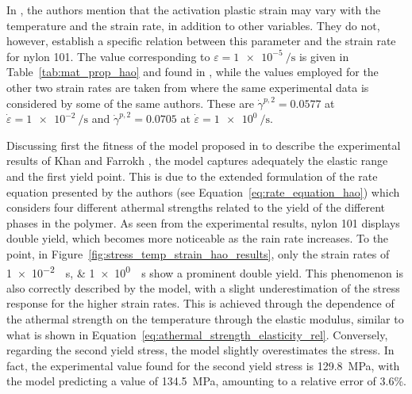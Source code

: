 In \cite{haoUnifiedAmorphousCrystalline2022}, the authors mention that the activation plastic strain may vary with the temperature and the strain rate, in addition to other variables.
They do not, however, establish a specific relation between this parameter and the strain rate for nylon 101.
The value corresponding to $\varepsilon=\SI{1e-5}{\per\second}$ is given in Table~\ref{tab:mat_prop_hao} and found in \cite{haoUnifiedAmorphousCrystalline2022}, while the values employed for the other two strain rates are taken from \cite{haoRatedependentConstitutiveModel2022} where the same experimental data is considered by some of the same authors.
These are $\dot\gamma^{p,2}=\num{0.0577}$ at $\dot\varepsilon = \SI{1e-2}{\per\second}$ and $\dot\gamma^{p,2}=\num{0.0705}$ at $\dot\varepsilon = \SI{1e0}{\per\second}$.

Discussing first the fitness of the model proposed in \cite{haoUnifiedAmorphousCrystalline2022} to describe the experimental results of Khan and Farrokh \citep{khanThermomechanicalResponseNylon2006}, the model captures adequately the elastic range and the first yield point.
This is due to the extended formulation of the rate equation presented by the authors (see Equation~\eqref{eq:rate_equation_hao}) which considers four different athermal strengths related to the yield of the different phases in the polymer.
As seen from the experimental results, nylon 101 displays double yield, which becomes more noticeable as the rain rate increases.
To the point, in Figure~\ref{fig:stress_temp_strain_hao_results}, only the strain rates of \SIlist{1e-2;1e0}{\per\second} show a prominent double yield.
This phenomenon is also correctly described by the model, with a slight underestimation of the stress response for the higher strain rates.
This is achieved through the dependence of the athermal strength on the temperature through the elastic modulus, similar to what is shown in Equation~\eqref{eq:athermal_strength_elasticity_rel}.
Conversely, regarding the second yield stress, the model slightly overestimates the stress.
In fact, the experimental value found for the second yield stress is \SI{129.8}{\mega\pascal}, with the model predicting a value of \SI{134.5}{\mega\pascal}, amounting to a relative error of \num{3.6}\%.


